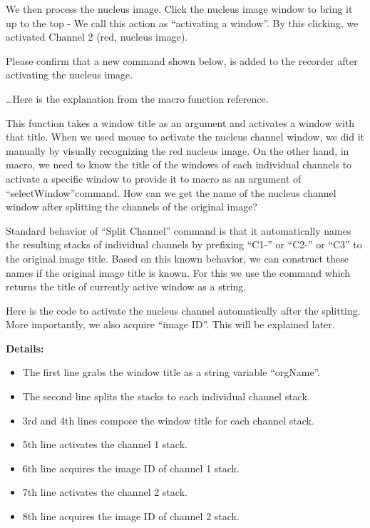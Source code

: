 We then process the nucleus image. Click the nucleus image window to bring it up to the top - We call this action as ``activating a window''. By this clicking, we activated Channel 2 (red, nucleus image).

Please confirm that a new command shown below, is added to the recorder after activating the nucleus image.


\dots  Here is the explanation from the macro function reference. 


This function takes a window title as an argument and activates a window with that title. When we used mouse to activate the nucleus channel window, we did it manually by visually recognizing the red nucleus image. On the other hand, in macro, we need to know the title of the windows of each individual channels to activate a specific window to provide it to macro as an argument of ``selectWindow''command. How can we get the name of the nucleus channel window after splitting the channels of the original image?

Standard behavior of ``Split Channel'' command is that it automatically names the resulting stacks of individual channels by prefixing ``C1-'' or ``C2-'' or ``C3'' to the original image title. Based on this known behavior, we can construct these names if the original image title is known. For this we use the command  which returns the title of currently active window as a string. 


Here is the code to activate the nucleus channel automatically after the splitting. More importantly, we also acquire ``image ID''. This will be explained later.  





\textbf{Details:} 
\begin{itemize}
\item The first line grabs the window title as a string variable ``orgName''. 
\item The second line splits the stacks to each individual channel stack.
\item 3rd and 4th lines compose the window title for each channel stack. 
\item 5th line activates the channel 1 stack. 
\item 6th line acquires the image ID of channel 1 stack. 
\item 7th line activates the channel 2 stack. 
\item 8th line acquires the image ID of channel 2 stack. 
\end{itemize}


